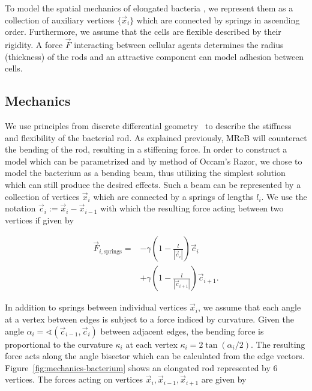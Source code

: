 \documentclass{article}
\begin{document}
To model the spatial mechanics of elongated bacteria \cite{Billaudeau2017}, we represent them as a
collection of auxiliary vertices $\{\vec{x}_i\}$ which are connected by springs in
ascending order.
Furthermore, we assume that the cells are flexible described by their rigidity.
A force $\vec{F}$ interacting between cellular agents determines the radius (thickness) of the
rods and an attractive component can model adhesion between cells.

\subsection{Mechanics}
\label{subsection:mechanical-model-mechanics}

We use principles from discrete differential geometry~\cite{bobenko2008discrete} to describe the
stiffness and flexibility of the bacterial rod.
As explained previously, MReB will counteract the bending of the rod, resulting in a stiffening
force.
In order to construct a model which can be parametrized and by method of Occam's Razor, we chose to
model the bacterium as a bending beam, thus utilizing the simplest solution which can still produce
the desired effects.
Such a beam can be represented by a collection of vertices $\vec{x}_i$ which are connected by a
springs of lengths $l_i$.
We use the notation $\vec{c}_i:=\vec{x}_i-\vec{x}_{i-1}$ with which the resulting force acting
between two vertices if given by

\begin{align}
    \vec{F}_{i,\text{springs}} =
        &-\gamma\left(1 - \frac{l}{\left|\vec{c}_i\right|}\right)
        \vec{c}_i\\
        &+ \gamma\left(1 - \frac{l}{\left|\vec{c}_{i+1}\right|}\right)
        \vec{c}_{i+1}.
\end{align}

In addition to springs between individual vertices $\vec{x}_i$, we assume that each angle at a
vertex between edges is subject to a force indiced by curvature.
Given the angle $\alpha_i = \sphericalangle(\vec{c}_{i-1},\vec{c}_i)$ between adjacent edges,
the bending force is proportional to the curvature $\kappa_i$ at each vertex
$\kappa_i = 2\tan(\alpha_i/2)$.
The resulting force acts along the angle bisector which can be calculated from the edge vectors.
Figure~\ref{fig:mechanics-bacterium} shows an elongated rod represented by $6$ vertices.
The forces acting on vertices $\vec{x}_i,\vec{x}_{i-1},\vec{x}_{i+1}$ are given by
\end{document}
